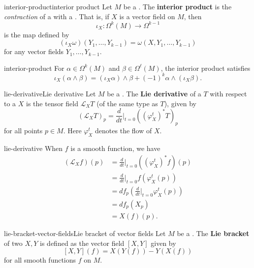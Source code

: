\begin{topic}{interior-product}{interior product}
    Let $M$ be a . The \textbf{interior product} is the \textit{contraction} of a  with a . That is, if $X$ is a vector field on $M$, then
    \[ \iota_X : \Omega^k(M) \to \Omega^{k - 1} \]
    is the map defined by
    \[ (\iota_X \omega)(Y_1, \ldots, Y_{k - 1}) = \omega(X, Y_1, \ldots, Y_{k - 1}) \]
    for any vector fields $Y_1, \ldots, Y_{k - 1}$.
\end{topic}

\begin{example}{interior-product}
    For $\alpha \in \Omega^k(M)$ and $\beta \in \Omega^\ell(M)$, the interior product satisfies
    \[ \iota_X (\alpha \wedge \beta) = (\iota_X \alpha) \wedge \beta + (-1)^k \alpha \wedge (\iota_X \beta) . \]
\end{example}

\begin{topic}{lie-derivative}{Lie derivative}
    Let $M$ be a . The \textbf{Lie derivative} of a  $T$ with respect to a  $X$ is the tensor field $\mathcal{L}_X T$ (of the same type as $T$), given by
    \[ (\mathcal{L}_X T)_p = \frac{d}{dt}\Big|_{t = 0} \left( \left(\varphi^t_X\right)^* T \right)_p \]
    for all points $p \in M$. Here $\varphi^t_X$ denotes the flow of $X$.
\end{topic}

\begin{example}{lie-derivative}
    When $f$ is a smooth function, we have
    \[ \begin{aligned}
        (\mathcal{L}_X f)(p)
            &= \frac{d}{dt}\Big|_{t = 0} \left(\left(\varphi^t_X\right)^* f \right)(p) \\
            &= \frac{d}{dt}\Big|_{t = 0} f \left(\varphi^t_X(p)\right) \\
            &= df_p \left( \frac{d}{dt}\Big|_{t = 0} \varphi^t_X(p) \right) \\
            &= df_p(X_p) \\
            &= X(f)(p) .
    \end{aligned} \]
    
\end{example}

\begin{topic}{lie-bracket-vector-fields}{Lie bracket of vector fields}
    Let $M$ be a . The \textbf{Lie bracket} of two  $X, Y$ is defined as the vector field $[X, Y]$ given by
    \[ [X, Y](f) = X(Y(f)) - Y(X(f)) \]
    for all smooth functions $f$ on $M$.
\end{topic}

